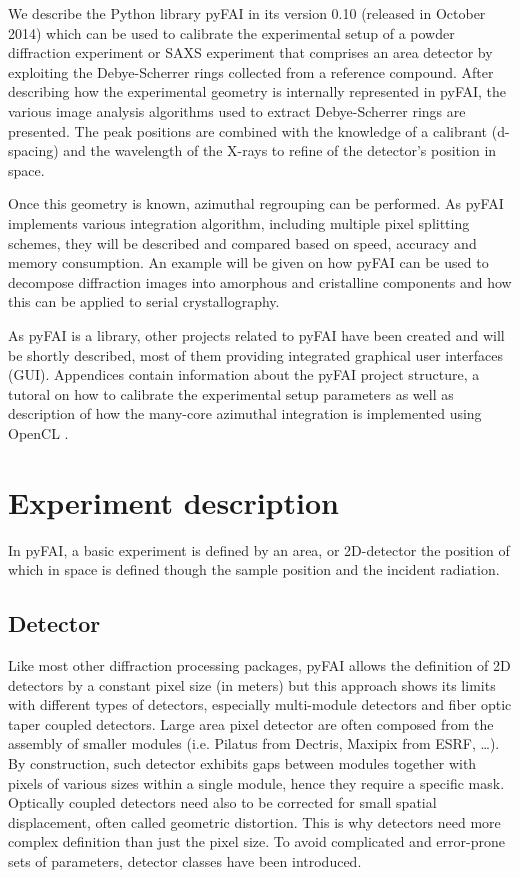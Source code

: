 \documentclass[preprint]{iucr}
\begin{document}
We describe the Python library pyFAI in its version 0.10
(released in October 2014) which can be used to calibrate the experimental
setup of a powder diffraction experiment or SAXS experiment that comprises
an area detector by exploiting the Debye-Scherrer rings collected from a
reference compound.
After describing how the experimental geometry is internally represented in
pyFAI, the various image analysis algorithms used to extract Debye-Scherrer
rings are presented.
The peak positions are combined with the knowledge of a calibrant (d-spacing)
and the wavelength of the X-rays  to refine of the detector's position in space.

Once this geometry is known, azimuthal regrouping can be performed.
As pyFAI implements various integration algorithm, including
multiple pixel splitting schemes, they will be described and compared
based on speed, accuracy and memory consumption.
An example will be given on how pyFAI can be used to decompose
diffraction images into amorphous and cristalline components and how this can be
applied to serial crystallography.

As pyFAI is a library, other projects related to pyFAI have been created and
will be shortly described, most of them providing integrated
graphical user interfaces (GUI).
Appendices contain information about the pyFAI project structure, a
tutoral on how to calibrate the experimental setup parameters as well as
description of how the many-core azimuthal integration is implemented using
OpenCL \cite{opencl}.

\section{Experiment description}

In pyFAI, a basic experiment is defined by an area, or 2D-detector the
position of which in space is defined though the sample position and the
incident radiation.

\subsection{Detector}
Like most other diffraction processing packages, pyFAI allows the definition of
2D detectors by a constant pixel size (in meters) but this approach shows its
limits with different types of detectors, especially multi-module detectors and fiber
optic taper coupled detectors. 
Large area pixel detector are often composed from
the assembly of smaller modules (i.e. Pilatus from Dectris, Maxipix from ESRF,
\ldots).
By construction, such detector exhibits gaps between modules together with
pixels of various sizes within a single module, hence they require a specific mask.
Optically coupled detectors need also to be corrected
for small spatial displacement, often called geometric distortion.
This is why detectors need more complex definition than just the pixel size. 
To avoid complicated and error-prone sets of parameters, detector classes have
been introduced.
\end{document}

